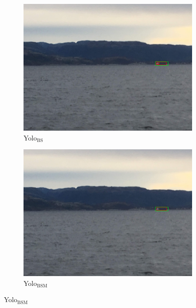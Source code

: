 \begin{figure}[h!]
\begin{subfigure}{.5\textwidth}
  \centering
  \includegraphics[width=0.8\linewidth]{results/case_tr_moor/yolo12/yolo1/2better/IMG_2591.jpg}
  \caption{Yolo$_{\text{BS}}$}
\end{subfigure}%
\begin{subfigure}{.5\textwidth}
  \centering
  \includegraphics[width=.8\linewidth]{results/case_tr_moor/yolo12/yolo2/2better/IMG_2591.jpg}
  \caption{Yolo$_{\text{BSM}}$}
\end{subfigure}


\end{figure}
